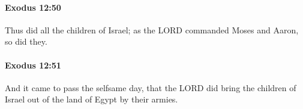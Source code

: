 		\paragraph{Exodus 12:50} %
			\label{EXODUS-12-50}

			Thus did all the children of Israel; as the LORD commanded Moses and Aaron, so did they.


		\paragraph{Exodus 12:51} %
			\label{EXODUS-12-51}

			And it came to pass the selfsame day, that the LORD did bring the children of Israel out of the land of Egypt by their armies.

